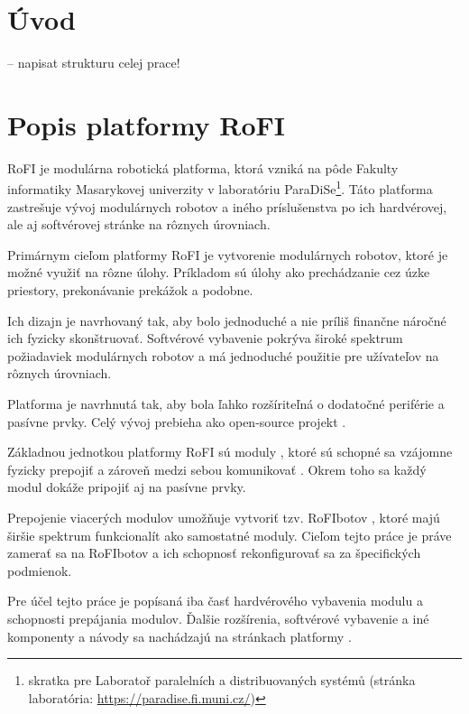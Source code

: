 \documentclass[
  digital, %
  oneside, %
  table,   %
  lof,     %
  nolot,     %
]{fithesis3}
\begin{document}
\chapter*{Úvod}
-- napisat strukturu celej prace!

\chapter{Popis platformy RoFI}
\label{sec:platform}
RoFI je modulárna robotická platforma, ktorá vzniká na pôde Fakulty informatiky Masarykovej univerzity v laboratóriu ParaDiSe\footnote{skratka pre Laboratoř paralelních a distribuovaných systémů (stránka laboratória: \url{https://paradise.fi.muni.cz/})}. Táto platforma zastrešuje vývoj modulárnych robotov a iného príslušenstva po ich hardvérovej, ale aj softvérovej stránke na rôznych úrovniach. 

Primárnym cieľom platformy RoFI je vytvorenie modulárnych robotov, ktoré je možné využiť na rôzne úlohy. Príkladom sú úlohy ako prechádzanie cez úzke priestory, prekonávanie prekážok a podobne. 

Ich dizajn je navrhovaný tak, aby bolo jednoduché a nie príliš finančne náročné ich fyzicky skonštruovať. Softvérové vybavenie pokrýva široké spektrum požiadaviek modulárnych robotov a má jednoduché použitie pre užívateľov na rôznych úrovniach. 

Platforma je navrhnutá tak, aby bola ľahko rozšíriteľná o dodatočné periférie a pasívne prvky. Celý vývoj prebieha ako open-source projekt \cite{rofiGit}. 

Základnou jednotkou platformy RoFI sú moduly \cite{mrazekMasterThesis}, ktoré sú schopné sa vzájomne fyzicky prepojiť a zároveň medzi sebou komunikovať \cite{rofiCom}. Okrem toho sa každý modul dokáže pripojiť aj na pasívne prvky. 

Prepojenie viacerých modulov umožňuje vytvoriť tzv. RoFIbotov \cite{rofiWeb}, ktoré majú širšie spektrum funkcionalít ako samostatné moduly. Cieľom tejto práce je práve zamerať sa na RoFIbotov a ich schopnosť rekonfigurovať sa za špecifických podmienok. 

Pre účel tejto práce je popísaná iba časť hardvérového vybavenia modulu a schopnosti prepájania modulov. Ďalšie rozšírenia, softvérové vybavenie a iné komponenty a návody sa nachádzajú na stránkach platformy \cite{rofiWeb}.
\end{document}
